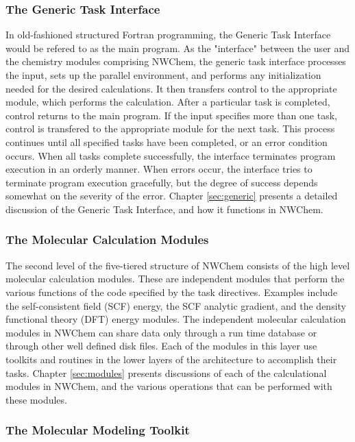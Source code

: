 \subsubsection{The Generic Task Interface}

In old-fashioned structured Fortran programming, the Generic Task
Interface would be refered to as the main program.  As the "interface"
between the user and the chemistry modules comprising NWChem, the
generic task interface processes the input, sets up the parallel 
environment, and performs any initialization needed for the
desired calculations.  It then transfers control to the appropriate
module, which performs the calculation.  After a particular task is
completed, control returns to the main program.
If the input specifies more than one task, 
control is transfered to the appropriate module for the next task.  This
process continues until all specified tasks have been completed, or
an error condition occurs.  When all tasks complete successfully, the
interface terminates program execution in an orderly manner.  When errors
occur, the interface tries to terminate program execution gracefully,
but the degree of success depends somewhat on the severity
of the error.  Chapter \ref{sec:generic} presents a detailed discussion
of the Generic Task Interface, and how it functions in NWChem.

\subsubsection{The Molecular Calculation Modules}

The second level of the five-tiered structure of NWChem consists of
the high level molecular calculation modules.  These are independent 
modules that perform the various functions of the code specified by the
task directives.  Examples 
include the self-consistent field (SCF) energy, the
SCF analytic gradient, and the density functional theory (DFT) energy 
modules.  The independent molecular calculation modules in NWChem 
can share data only through 
a run time database or through other well defined disk files.  
Each of the modules in this layer use
toolkits and routines in the lower layers of the architecture to
accomplish their tasks.  Chapter \ref{sec:modules} presents discussions
of each of the calculational modules in NWChem, and the various operations
that can be performed with these modules.

\subsubsection{The Molecular Modeling Toolkit}

